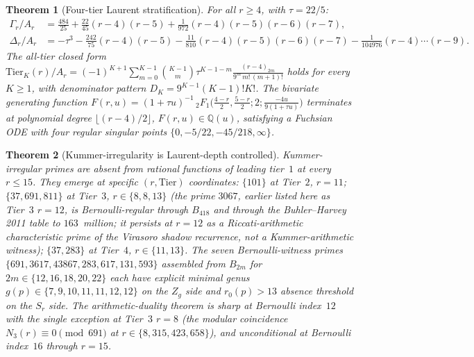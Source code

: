 \documentclass[11pt]{article}
\providecommand{\bQ}{\mathbb{Q}}
\newtheorem{theorem}{Theorem}[section]
\begin{document}
\begin{theorem}[Four-tier Laurent stratification]
For all $r\ge 4$, with $\tau = 22/5$:
\begin{align*}
\Gamma_r / A_r &= \tfrac{484}{25} + \tfrac{22}{45}(r{-}4)(r{-}5)
+ \tfrac{1}{972}(r{-}4)(r{-}5)(r{-}6)(r{-}7),\\
\Delta_r / A_r &= -\tau^3
- \tfrac{242}{75}(r{-}4)(r{-}5)
- \tfrac{11}{810}(r{-}4)(r{-}5)(r{-}6)(r{-}7)
- \tfrac{1}{104976}(r{-}4)\cdots(r{-}9).
\end{align*}
The all-tier closed form
$\mathrm{Tier}_K(r)/A_r = (-1)^{K+1}
\sum_{m=0}^{K-1}\binom{K-1}{m}\tau^{K-1-m}
\tfrac{(r-4)_{2m}}{9^m\,m!\,(m+1)!}$ holds for every $K\ge 1$, with
denominator pattern $D_K = 9^{K-1}(K-1)!K!$. The bivariate
generating function $F(r,u) = (1+\tau u)^{-1}\,{}_2F_1\bigl(
\tfrac{4-r}{2},\tfrac{5-r}{2};2;\tfrac{-4u}{9(1+\tau u)}\bigr)$
terminates at polynomial degree $\lfloor(r-4)/2\rfloor$,
$F(r,u)\in\bQ(u)$, satisfying a Fuchsian ODE with four regular
singular points $\{0, -5/22, -45/218, \infty\}$.
\end{theorem}

\begin{theorem}[Kummer-irregularity is Laurent-depth controlled]
Kummer-irregular primes are absent from rational functions of
leading tier~$1$ at every $r\le 15$. They emerge at specific
$(r,\mathrm{Tier})$ coordinates: $\{101\}$ at Tier~$2$, $r=11$;
$\{37, 691, 811\}$ at Tier~$3$, $r\in\{8,8,13\}$ (the prime
$3067$, earlier listed here as Tier~$3$ $r=12$, is Bernoulli-regular
through $B_{418}$ and through the
Buhler--Harvey 2011 table to $163$~million; it persists at
$r=12$ as a Riccati-arithmetic characteristic prime of the
Virasoro shadow recurrence, not a Kummer-arithmetic witness);
$\{37, 283\}$ at Tier~$4$, $r\in\{11,13\}$. The seven Bernoulli-witness
primes $\{691, 3617, 43867, 283, 617, 131, 593\}$ assembled from
$B_{2m}$ for $2m\in\{12,16,18,20,22\}$ each have explicit
minimal genus $g(p)\in\{7,9,10,11,11,12,12\}$ on the $Z_g$ side and
$r_0(p) > 13$ absence threshold on the $S_r$ side. The
arithmetic-duality theorem is sharp at Bernoulli index~$12$ with
the single exception at Tier~$3$ $r=8$ (the modular coincidence
$N_3(r)\equiv 0\pmod{691}$ at $r\in\{8,315,423,658\}$), and
unconditional at Bernoulli index~$16$ through $r=15$.
\end{theorem}
\end{document}
